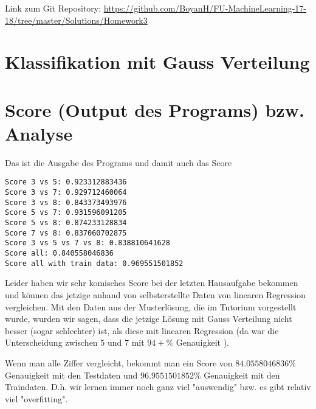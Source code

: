\usepackage{graphicx}
\usepackage{amsmath}
\usepackage{amssymb}
\usepackage{fancyvrb}

\newcommand{\dozent}{Prof. R. Rojas}					%
\newcommand{\projectNo}{3}
\newcommand{\veranstaltung}{Mustererkennung}
\newcommand{\semester}{WS17/18}
\newcommand{\studenten}{Boyan Hristov, Nedeltscho Petrov}





Link zum Git Repository: \url{https://github.com/BoyanH/FU-MachineLearning-17-18/tree/master/Solutions/Homework\projectNo}


\section*{Klassifikation mit Gauss Verteilung}


\section*{Score (Output des Programs) bzw. Analyse}
Das ist die Ausgabe des Programs und damit auch das Score
\begin{lstlisting}
Score 3 vs 5: 0.923312883436
Score 3 vs 7: 0.929712460064
Score 3 vs 8: 0.843373493976
Score 5 vs 7: 0.931596091205
Score 5 vs 8: 0.874233128834
Score 7 vs 8: 0.837060702875
Score 3 vs 5 vs 7 vs 8: 0.838810641628
Score all: 0.840558046836
Score all with train data: 0.969551501852
\end{lstlisting}

Leider haben wir sehr komisches Score bei der letzten Hausaufgabe bekommen und können das jetzige anhand von selbsterstellte Daten von linearen Regression vergleichen. Mit den Daten aus der Musterlösung, die im Tutorium vorgestellt wurde, wurden wir sagen, dass die jetzige Lösung mit Gauss Verteilung nicht besser (sogar schlechter) ist, als diese mit linearen Regression (da war die Unterscheidung zwischen 5 und 7 mit $94+\%$ Genauigkeit ).

Wenn man alle Ziffer vergleicht, bekommt man ein Score von $84.0558046836\%$ Genauigkeit mit den Testdaten und $96.9551501852\%$ Genauigkeit mit den Traindaten. D.h. wir lernen immer noch ganz viel "auswendig" bzw. es gibt relativ viel "overfitting". 

